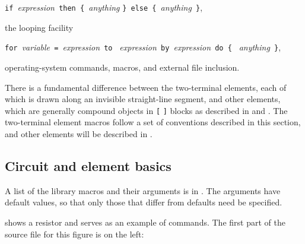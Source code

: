 \verb|if |{\sl expression}\verb| then { |{\sl anything} 
  \verb|} else { |{\sl anything}\verb| }|,

\noindent%
the looping facility

\verb|for |{\sl variable}\verb| = |{\sl expression}\verb| to |%
{\sl expression}\verb| by |{\sl expression}\verb| do { |%
{\sl anything}\verb| }|,

\noindent%
operating-system commands, \pic macros, and external file inclusion.

There is a fundamental difference between the two-terminal elements, each
of which is drawn along an invisible straight-line segment,
and other elements, which are generally compound objects
in {\tt[} {\tt]} blocks as described in 
and .
The two-terminal element macros follow a
set of conventions described in this section, and other elements will
be described in .

\subsection{Circuit and element basics\label{Basics:}}
A list of the library macros and their arguments is in
.  The arguments have default values, so that only
those that differ from defaults need be specified.

 shows a resistor and serves as
an example of \pic commands.
The first part of the source file for this figure is 
on the left:

